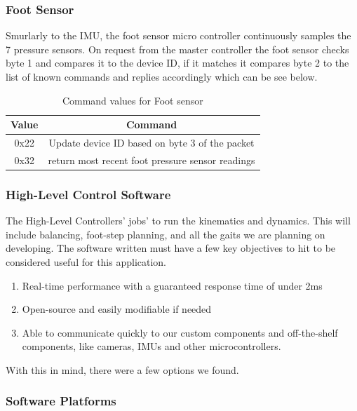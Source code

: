 \subsubsection{Foot Sensor}
Smurlarly to the IMU, the foot sensor micro controller continuously samples the 7 pressure sensors. On request from the master controller the foot sensor checks byte 1 and compares it to the device ID, if it matches it compares byte 2 to the list of known commands and replies accordingly which can be see below.
\begin{table}[H]
        \centering
        \begin{tabular}{|c|c|}
        \hline
            Value & Command \\
            \hline
            0x22 & Update device ID based on byte 3 of the packet\\
            0x32 & return most recent foot pressure sensor readings\\
            \hline
            \end{tabular}
        \caption{Command values for Foot sensor}
        \label{tab:my_label}
    \end{table}

\subsubsection{High-Level Control Software}
The High-Level Controllers’ jobs’ to run the kinematics and dynamics. This will include balancing, foot-step planning, and all the gaits we are planning on developing. The software written must have a few key objectives to hit to be considered useful for this application.  
\begin{enumerate}
    \item Real-time performance with a guaranteed response time of under 2ms
    \item Open-source and easily modifiable if needed
    \item Able to communicate quickly to our custom components and off-the-shelf components, like cameras, IMUs and other microcontrollers.
\end{enumerate}
With this in mind, there were a few options we found.

\subsubsection{Software Platforms}
